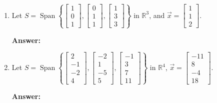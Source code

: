\documentclass[10pt,letterpaper,final]{report}
\newcommand{\R}{\mathbb{R}}
\DeclareMathOperator{\Span}{Span}
\begin{document}
\begin{enumerate}[label=(\alph*)]
  \item Let $S = \Span \left\{
          \begin{bmatrix}
            1 \\
            0 \\
            1
          \end{bmatrix},
          \begin{bmatrix}
            0 \\
            1 \\
            1
          \end{bmatrix},
          \begin{bmatrix}
            1 \\
            3 \\
            3
          \end{bmatrix}
        \right\}$ in $\R^3$, and $\vec{x} = \begin{bmatrix}
          1 \\
          1 \\
          2
        \end{bmatrix}$.

        \medskip
        \noindent\textbf{Answer:}

        \pagebreak

  \item Let $S = \Span \left\{
          \begin{bmatrix}
            2  \\
            -1 \\
            -2 \\
            4
          \end{bmatrix},
          \begin{bmatrix}
            -2 \\
            1  \\
            -5 \\
            5
          \end{bmatrix},
          \begin{bmatrix}
            -1 \\
            3  \\
            7  \\
            11
          \end{bmatrix}
        \right\}$ in $\R^4$, $\vec{x} = \begin{bmatrix}
          -11 \\
          8   \\
          -4  \\
          18
        \end{bmatrix}$.

        \medskip
        \noindent\textbf{Answer:}
\end{enumerate}
\end{document}
